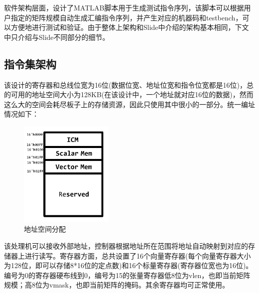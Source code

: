 \documentclass{article}
\begin{document}
软件架构层面，设计了MATLAB脚本用于生成测试指令序列，该脚本可以根据用户指定的矩阵规模自动生成汇编指令序列，并产生对应的机器码和testbench，可以方便地进行测试和验证。由于整体上架构和Slide中介绍的架构基本相同，下文中只介绍与Slide不同部分的细节。

\subsection{指令集架构}
    该设计的寄存器和总线位宽为16位(数据位宽、地址位宽和指令位宽都是16位)，总的可用的地址空间大小为128KB(在该设计中，一个地址就对应16位的数据)，然而这么大的空间会耗尽板子上的存储资源，因此只使用其中很小的一部分。统一编址情况如下：
    \begin{figure}[!ht]
        \centering
        \includegraphics[width = 0.4\textwidth]{Address.png}
        \caption{地址空间分配}
    \end{figure}
    
    该处理机可以接收外部地址，控制器根据地址所在范围将地址自动映射到对应的存储器上进行读写。寄存器方面，总共设置了16个向量寄存器(每个向量寄存器大小为128位，即可以存储8*16位的定点数)和16个标量寄存器(寄存器位宽也为16位)。编号为0的寄存器硬布线到0，编号为15的张量寄存器低8位为vlen，也即当前矩阵规模；高8位为vmask，也即当前矩阵的掩码。其余寄存器均可正常使用。
\end{document}
